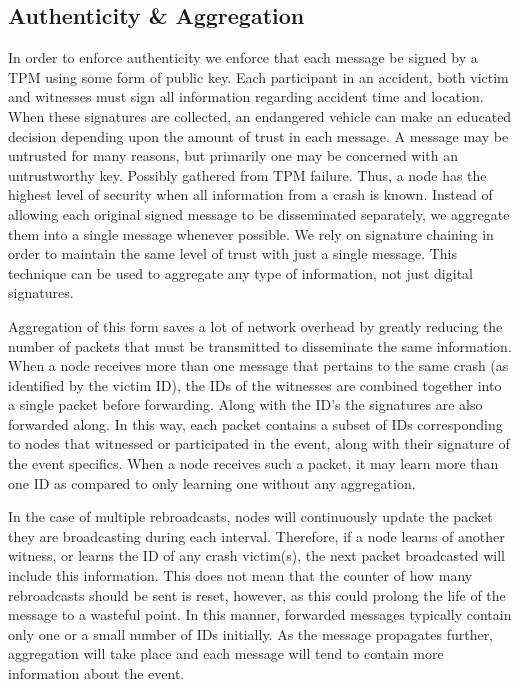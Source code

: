 \documentclass{IEEEtran}
\begin{document}
\subsection{Authenticity \& Aggregation}

In order to enforce authenticity we enforce that each message be signed by a TPM using some form of public key. Each participant in an accident, both victim and witnesses must sign all information regarding accident time and location. When these signatures are collected, an endangered vehicle can make an educated decision depending upon the amount of trust in each message. A message may be untrusted for many reasons, but primarily one may be concerned with an untrustworthy key. Possibly gathered from TPM failure. Thus, a node has the highest level of security when all information from a crash is known. Instead of allowing each original signed message to be disseminated separately, we aggregate them into a single message whenever possible. We rely on signature chaining in order to maintain the same level of trust with just a single message. This technique can be used to aggregate any type of information, not just digital signatures.

Aggregation of this form saves a lot of network overhead by greatly reducing the number of packets that must be transmitted to disseminate the same information.
When a node receives more than one message that pertains to the same crash (as identified by the victim ID), the IDs of the witnesses are combined together into a single packet before forwarding. Along with the ID's the signatures are also forwarded along.
In this way, each packet contains a subset of IDs corresponding to nodes that witnessed or participated in the event, along with their signature of the event specifics.
When a node receives such a packet, it may learn more than one ID as compared to only learning one without any aggregation.

In the case of multiple rebroadcasts, nodes will continuously update the packet they are broadcasting during each interval.
Therefore, if a node learns of another witness, or learns the ID of any crash victim(s), the next packet broadcasted will include this information.
This does not mean that the counter of how many rebroadcasts should be sent is reset, however, as this could prolong the life of the message to a wasteful point.
In this manner, forwarded messages typically contain only one or a small number of IDs initially.
As the message propagates further, aggregation will take place and each message will tend to contain more information about the event.
\end{document}

